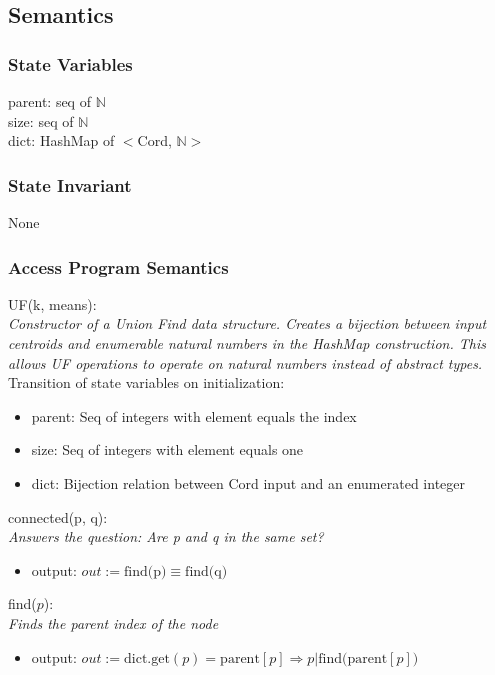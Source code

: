 \documentclass[12pt]{article}
\begin{document}
\subsection* {Semantics}

\subsubsection* {State Variables}

parent: seq of $\mathbb{N}$\\
size: seq of $\mathbb{N}$\\
dict: HashMap of $<$Cord, $\mathbb{N}>$

\subsubsection* {State Invariant}

None

\subsubsection* {Access Program Semantics}

UF(k, means):\\
\textit{Constructor of a Union Find data structure. Creates a bijection between
input centroids and enumerable natural numbers in the HashMap construction. This
allows UF operations to operate on natural numbers instead of abstract types. }\\
\noindent
Transition of state variables on initialization:
\begin{itemize}
\item parent: Seq of integers with element equals the index
\item size: Seq of integers with element equals one
\item dict: Bijection relation between Cord input and an enumerated integer
\end{itemize}

\noindent
connected(p, q):\\
\textit{Answers the question: Are p and q in the same set?}
\begin{itemize}
\item output: $out := \mbox{find(p)} \equiv \mbox{find(q)}$
\end{itemize}

\noindent
find($p$):\\
\textit{Finds the parent index of the node}
\begin{itemize}
\item output: $out := \mbox{dict.get}(p) = \mbox{parent}[p] \Rightarrow p | \mbox{find(parent}[p])$
\end{itemize}
\end{document}
